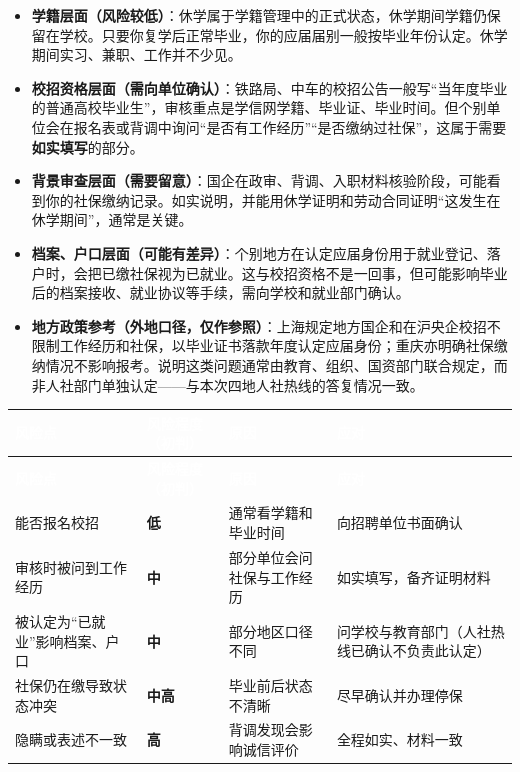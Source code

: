 \documentclass[UTF8,fontset=fandol,zihao=-4]{ctexart}
\newcommand{\lead}[1]{\par\Needspace{6\baselineskip}\vspace{0.3em}\noindent{\heiti\bfseries #1}\par}
\newcommand{\hc}[1]{\textcolor{white}{\heiti\bfseries #1}}
\newcommand{\lowrisk}{\textcolor{lowc}{\bfseries 低}}
\newcommand{\midrisk}{\textcolor{midc}{\bfseries 中}}
\newcommand{\midhigh}{\textcolor{midc}{\bfseries 中高}}
\newcommand{\highrisk}{\textcolor{highc}{\bfseries 高}}
\begin{document}
\lead{2. 分点说明}

\begin{itemize}
  \item \textbf{学籍层面（风险较低）}：休学属于学籍管理中的正式状态，休学期间学籍仍保留在学校。只要你复学后正常毕业，你的应届届别一般按毕业年份认定。休学期间实习、兼职、工作并不少见。
  \item \textbf{校招资格层面（需向单位确认）}：铁路局、中车的校招公告一般写“当年度毕业的普通高校毕业生”，审核重点是学信网学籍、毕业证、毕业时间。但个别单位会在报名表或背调中询问“是否有工作经历”“是否缴纳过社保”，这属于需要\textbf{如实填写}的部分。
  \item \textbf{背景审查层面（需要留意）}：国企在政审、背调、入职材料核验阶段，可能看到你的社保缴纳记录。如实说明，并能用休学证明和劳动合同证明“这发生在休学期间”，通常是关键。
  \item \textbf{档案、户口层面（可能有差异）}：个别地方在认定应届身份用于就业登记、落户时，会把已缴社保视为已就业。这与校招资格不是一回事，但可能影响毕业后的档案接收、就业协议等手续，需向学校和就业部门确认。
  \item \textbf{地方政策参考（外地口径，仅作参照）}：上海规定地方国企和在沪央企校招不限制工作经历和社保，以毕业证书落款年度认定应届身份；重庆亦明确社保缴纳情况不影响报考。说明这类问题通常由教育、组织、国资部门联合规定，而非人社部门单独认定——与本次四地人社热线的答复情况一致。
\end{itemize}

\lead{3. 风险分级}

\begingroup
{}
\begin{longtable}{@{}P{3.79cm}P{2.52cm}P{4.21cm}P{4.63cm}@{}}
\hc{风险点} & \hc{风险程度（初判）} & \hc{原因} & \hc{应对}\\
\endfirsthead
{}\hc{风险点} & \hc{风险程度（初判）} & \hc{原因} & \hc{应对}\\
\endhead
能否报名校招 & \lowrisk{} & 通常看学籍和毕业时间 & 向招聘单位书面确认\\
审核时被问到工作经历 & \midrisk{} & 部分单位会问社保与工作经历 & 如实填写，备齐证明材料\\
被认定为“已就业”影响档案、户口 & \midrisk{} & 部分地区口径不同 & 问学校与教育部门（人社热线已确认不负责此认定）\\
社保仍在缴导致状态冲突 & \midhigh{} & 毕业前后状态不清晰 & 尽早确认并办理停保\\
隐瞒或表述不一致 & \highrisk{} & 背调发现会影响诚信评价 & 全程如实、材料一致\\
\end{longtable}
\endgroup
\end{document}
